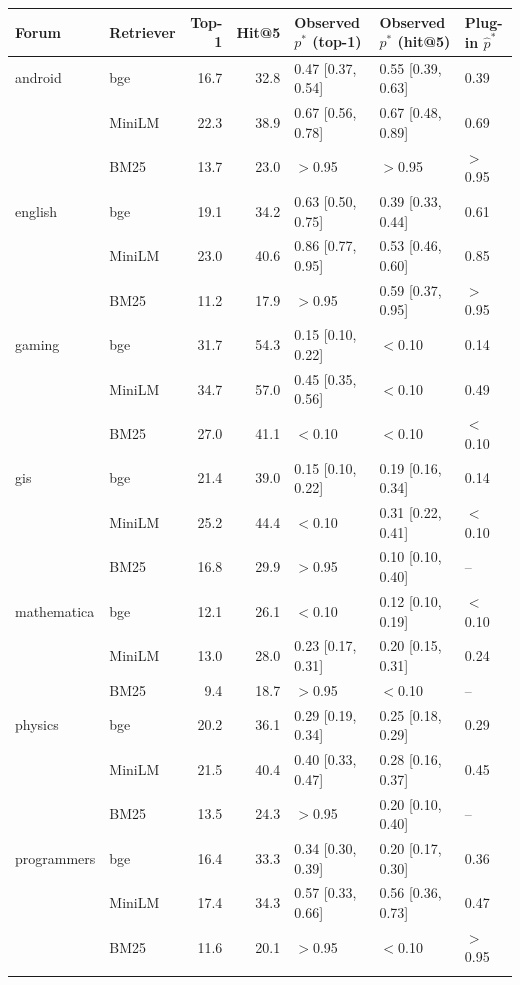 \begin{tabular}{llrrlll}\toprule Forum & Retriever & Top-1 & Hit@5 & Observed $p^*$ (top-1) & Observed $p^*$ (hit@5) & Plug-in $\hat p^*$\\\midrule
android & bge & 16.7 & 32.8 & 0.47 [0.37, 0.54] & 0.55 [0.39, 0.63] & 0.39\\
 & MiniLM & 22.3 & 38.9 & 0.67 [0.56, 0.78] & 0.67 [0.48, 0.89] & 0.69\\
 & BM25 & 13.7 & 23.0 & $>$0.95 & $>$0.95 & $>$0.95\\
\addlinespace[1pt]
english & bge & 19.1 & 34.2 & 0.63 [0.50, 0.75] & 0.39 [0.33, 0.44] & 0.61\\
 & MiniLM & 23.0 & 40.6 & 0.86 [0.77, 0.95] & 0.53 [0.46, 0.60] & 0.85\\
 & BM25 & 11.2 & 17.9 & $>$0.95 & 0.59 [0.37, 0.95] & $>$0.95\\
\addlinespace[1pt]
gaming & bge & 31.7 & 54.3 & 0.15 [0.10, 0.22] & $<$0.10 & 0.14\\
 & MiniLM & 34.7 & 57.0 & 0.45 [0.35, 0.56] & $<$0.10 & 0.49\\
 & BM25 & 27.0 & 41.1 & $<$0.10 & $<$0.10 & $<$0.10\\
\addlinespace[1pt]
gis & bge & 21.4 & 39.0 & 0.15 [0.10, 0.22] & 0.19 [0.16, 0.34] & 0.14\\
 & MiniLM & 25.2 & 44.4 & $<$0.10 & 0.31 [0.22, 0.41] & $<$0.10\\
 & BM25 & 16.8 & 29.9 & $>$0.95 & 0.10 [0.10, 0.40] & --\\
\addlinespace[1pt]
mathematica & bge & 12.1 & 26.1 & $<$0.10 & 0.12 [0.10, 0.19] & $<$0.10\\
 & MiniLM & 13.0 & 28.0 & 0.23 [0.17, 0.31] & 0.20 [0.15, 0.31] & 0.24\\
 & BM25 & 9.4 & 18.7 & $>$0.95 & $<$0.10 & --\\
\addlinespace[1pt]
physics & bge & 20.2 & 36.1 & 0.29 [0.19, 0.34] & 0.25 [0.18, 0.29] & 0.29\\
 & MiniLM & 21.5 & 40.4 & 0.40 [0.33, 0.47] & 0.28 [0.16, 0.37] & 0.45\\
 & BM25 & 13.5 & 24.3 & $>$0.95 & 0.20 [0.10, 0.40] & --\\
\addlinespace[1pt]
programmers & bge & 16.4 & 33.3 & 0.34 [0.30, 0.39] & 0.20 [0.17, 0.30] & 0.36\\
 & MiniLM & 17.4 & 34.3 & 0.57 [0.33, 0.66] & 0.56 [0.36, 0.73] & 0.47\\
 & BM25 & 11.6 & 20.1 & $>$0.95 & $<$0.10 & $>$0.95\\
\addlinespace[1pt]

\end{tabular}
